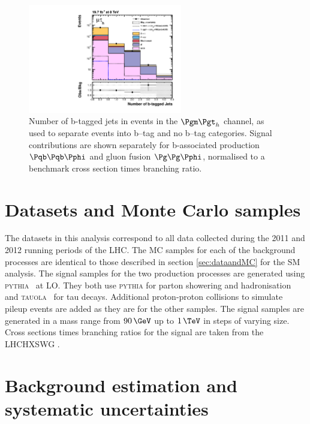 \begin{figure}[tbh]
\includegraphics[width=0.6\textwidth]{plots/htt-mssm/n_bjets_inclusive_mt_2012_log.pdf}

\caption[Number of b-tagged jets in events in the $\mutau$ channel, as used to separate
events into b--tag and no b--tag categories.]{Number of b-tagged jets in events
in the $\mutau$ channel, as used to separate
events into b--tag and no b--tag categories. Signal contributions are shown
separately for b-associated production $\Pqb\Pqb\Pphi$ and gluon fusion
$\Pg\Pg\Pphi$, normalised to a benchmark cross section times branching ratio.}
\label{fig:nbtag}
\end{figure}

\section{Datasets and Monte Carlo samples}
\label{sec:mssmdataandMC}

The datasets in this analysis correspond to all data collected during the 2011
and 2012 running periods of the LHC.
The \ac{MC} samples for each of the background processes are
identical to those described in section \ref{sec:dataandMC} for the \ac{SM}
analysis. The signal samples for the two production processes are
generated using \textsc{pythia}~\cite{Sjostrand:2006za} at \ac{LO}. They both use \textsc{pythia}
for parton showering and hadronisation and \textsc{tauola}~\cite{TAUOLA} for tau
decays. Additional proton-proton collisions to simulate pileup events are added
as they are for the other samples. The signal samples are generated in a mass range from
$90\,\GeV$ up to $1\,\TeV$ in steps of varying size. Cross sections times
branching ratios for the signal are taken from the \ac{LHCHXSWG}
\cite{LHCHiggsCrossSectionWorkingGroup:2011ti,Dittmaier:2012vm,Heinemeyer:2013tqa}.

\section{Background estimation and systematic uncertainties}
\label{sec:mssmBackgroundsSysts}

